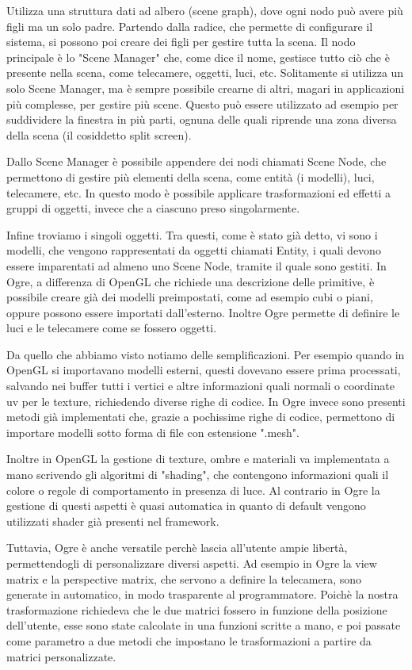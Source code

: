 Utilizza una struttura dati ad albero (scene graph), dove ogni nodo può avere più figli ma un solo padre. Partendo dalla radice, che permette di configurare il sistema, si possono poi creare dei figli per gestire tutta la scena. Il nodo principale è lo "Scene Manager" che, come dice il nome, gestisce tutto ciò che è presente nella scena, come telecamere, oggetti, luci, etc. Solitamente si utilizza un solo Scene Manager, ma è sempre possibile crearne di altri, magari in applicazioni più complesse, per gestire più scene. Questo può essere utilizzato ad esempio per suddividere la finestra in più parti, ognuna delle quali riprende una zona diversa della scena (il cosiddetto split screen).

Dallo Scene Manager è possibile appendere dei nodi chiamati Scene Node, che permettono di gestire più elementi della scena, come entità (i modelli), luci, telecamere, etc. In questo modo è possibile applicare trasformazioni ed effetti a gruppi di oggetti, invece che a ciascuno preso singolarmente.

Infine troviamo i singoli oggetti. Tra questi, come è stato già detto, vi sono i modelli, che vengono rappresentati da oggetti chiamati Entity, i quali devono essere imparentati ad almeno uno Scene Node, tramite il quale sono gestiti. In Ogre, a differenza di OpenGL che richiede una descrizione delle primitive, è possibile creare già dei modelli preimpostati, come ad esempio cubi o piani, oppure possono essere importati dall'esterno.
Inoltre Ogre permette di definire le luci e le telecamere come se fossero oggetti.

Da quello che abbiamo visto notiamo delle semplificazioni. Per esempio quando in OpenGL si importavano modelli esterni, questi dovevano essere prima processati, salvando nei buffer tutti i vertici e altre informazioni quali normali o coordinate uv per le texture, richiedendo diverse righe di codice.
In Ogre invece sono presenti metodi già implementati che, grazie a pochissime righe di codice, permettono di importare modelli sotto forma di file con estensione ".mesh".

Inoltre in OpenGL la gestione di texture, ombre e materiali va implementata a mano scrivendo gli algoritmi di "shading", che contengono informazioni quali il colore o regole di comportamento in presenza di luce. Al contrario in Ogre la gestione di questi aspetti è quasi automatica in quanto di default vengono utilizzati shader già presenti nel framework.

Tuttavia, Ogre è anche versatile perchè lascia all'utente ampie libertà, permettendogli di personalizzare diversi aspetti. Ad esempio in Ogre la view matrix e la perspective matrix, che servono a definire la telecamera, sono generate in automatico, in modo trasparente al programmatore. Poichè la nostra trasformazione richiedeva che le due matrici fossero in funzione della posizione dell'utente, esse sono state calcolate in una funzioni scritte a mano, e poi passate come parametro a due metodi che impostano le trasformazioni a partire da matrici personalizzate.

